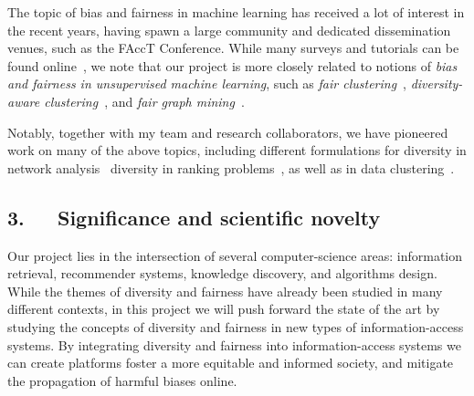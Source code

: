 \documentclass[a4paper,11pt]{article}
\begin{document}

The topic of bias and fairness in machine learning has received a lot of interest in the recent years, 
having spawn a large community and dedicated dissemination venues, such as the FAccT Conference. 
While many surveys and tutorials can be found online~\cite{caton2020fairness,mehrabi2021survey}, 
we note that our project is more closely related to notions of
\emph{bias and fairness in unsupervised machine learning}, 
such as 
\emph{fair clustering}~\cite{chierichetti2017fair}, 
\emph{diversity-aware clustering}~\cite{thejaswi2021diversity}, 
and \emph{fair graph mining}~\cite{dong2023fairness}.


Notably, together with my team and research collaborators, 
we have pioneered work on many of the above topics,
including
different formulations for diversity in network analysis~\cite{adriaens2023minimizing,cinus2023rebalancing,coupette2023reducing,oettershagen2024finding}
diversity in ranking problems~\cite{zhang2022ranking}, 
as well as in data clustering~\cite{thejaswi2021diversity}.

\subsection*{3.~~~Significance and scientific novelty}



Our project lies in the intersection of several computer-science areas:
information retrieval, recommender systems, knowledge discovery, and algorithms design. 
While the themes of diversity and fairness have already been studied in many different contexts,
in this project we will push forward the state of the art %
by studying the concepts of diversity and fairness in new types of information-access systems.
By integrating  diversity and fairness into information-access systems 
we can create platforms foster a more equitable and informed society, 
and mitigate the propagation of harmful biases online.
\end{document}
